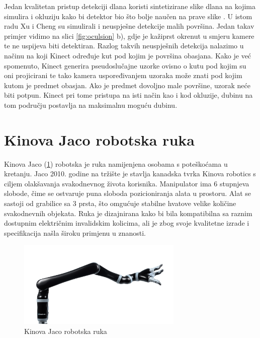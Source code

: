 \documentclass[times, utf8, diplomski, numeric]{fer}
\begin{document}
Jedan kvalitetan pristup detekciji dlana koristi sintetizirane slike dlana na kojima simulira i okluziju kako bi detektor bio što bolje naučen na prave slike \citep{xu2013efficient}. U istom radu Xu i Cheng su simulirali i neuspješne detekcije malih površina. Jedan takav primjer vidimo na slici \ref{fig:oculsion} b), gdje je kažiprst okrenut u smjeru kamere te ne uspijeva biti detektiran. Razlog takvih neuspješnih detekcija nalazimo u načinu na koji Kinect određuje kut pod kojim je površina obasjana. Kako je već spomenuto, Kinect generira pseudoslučajne uzorke ovisno o kutu pod kojim su oni projicirani te tako kamera uspoređivanjem uzoraka može znati pod kojim kutom je predmet obasjan. Ako je predmet dovoljno male površine, uzorak neće biti potpun. Kinect pri tome pristupa na isti način kao i kod okluzije, dubinu na tom području postavlja na maksimalnu moguću dubinu.

\newpage
\section{Kinova Jaco robotska ruka}
Kinova Jaco (\ref{JACO2}) robotska je ruka namijenjena osobama s poteškoćama u kretanju.
Jaco 2010. godine na tržište je stavlja kanadska tvrka Kinova robotics s ciljem olakšavanja svakodnevnog života korisnika.
Manipulator ima 6 stupnjeva slobode, čime se ostvaruje puna sloboda pozicioniranja alata u prostoru.
Alat se sastoji od grabilice sa 3 prsta, što omgućuje stabilne hvatove velike količine svakodnevnih objekata.
Ruka je dizajnirana kako bi bila kompatibilna sa raznim dostupnim električnim invalidskim kolicima, ali je zbog svoje kvalitetne izrade i specifikacija našla široku primjenu u znanosti.

\begin{figure}[h!]
\centering
\includegraphics[width = 0.7\textwidth]{JACO2}
\caption{Kinova Jaco robotska ruka} \label{JACO2}
\end{figure}
\end{document}
